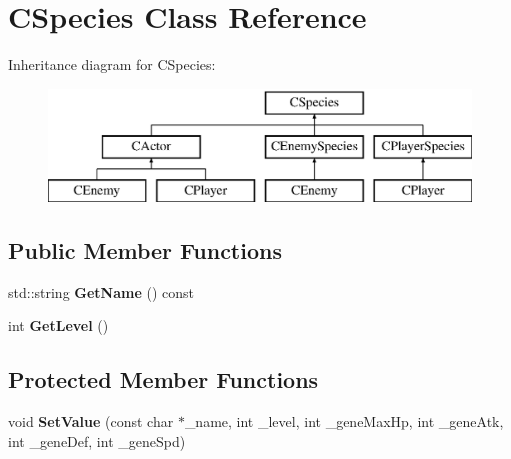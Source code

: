 \hypertarget{class_c_species}{}\section{C\+Species Class Reference}
\label{class_c_species}
Inheritance diagram for C\+Species\+:\begin{figure}[H]
\begin{center}
\leavevmode
\includegraphics[height=3.000000cm]{class_c_species}
\end{center}
\end{figure}
\subsection*{Public Member Functions}
\begin{DoxyCompactItemize}
\item 
std\+::string {\bfseries Get\+Name} () const \hypertarget{class_c_species_a8fc218299b0b0d2635538f2caff84207}{}\label{class_c_species_a8fc218299b0b0d2635538f2caff84207}

\item 
int {\bfseries Get\+Level} ()\hypertarget{class_c_species_a16e911c3b7c52084d5dff8e187fb575f}{}\label{class_c_species_a16e911c3b7c52084d5dff8e187fb575f}

\end{DoxyCompactItemize}
\subsection*{Protected Member Functions}
\begin{DoxyCompactItemize}
\item 
void {\bfseries Set\+Value} (const char $\ast$\+\_\+name, int \+\_\+level, int \+\_\+gene\+Max\+Hp, int \+\_\+gene\+Atk, int \+\_\+gene\+Def, int \+\_\+gene\+Spd)\hypertarget{class_c_species_afddefbaaa3ff47530114b4816be0665d}{}\label{class_c_species_afddefbaaa3ff47530114b4816be0665d}

\end{DoxyCompactItemize}
